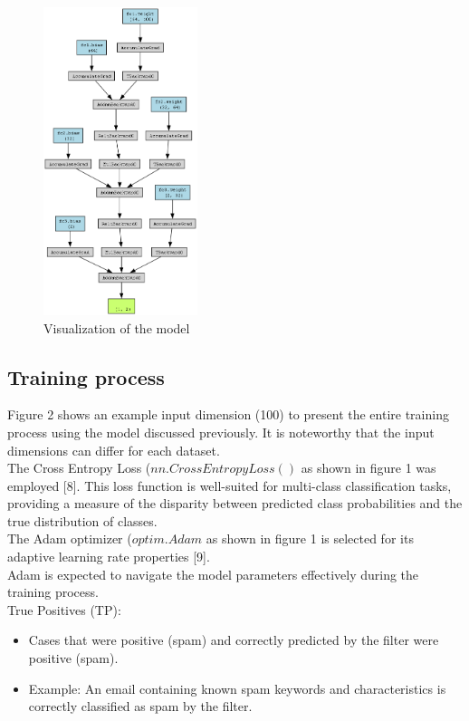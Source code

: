 \begin{figure}[htp]
    \centering
    \includegraphics[width=0.4\textwidth]{text_classifier_model.png}
    \caption{Visualization of the model}
\end{figure}

\subsection{Training process}
Figure 2 shows an example input dimension (100) to present the entire training process using the model discussed previously. It is noteworthy that the input dimensions can differ for each dataset. \\

\indent The Cross Entropy Loss ($nn.CrossEntropyLoss()$ as shown in figure 1 was employed [8].
This loss function is well-suited for multi-class classification tasks, providing a measure of the disparity between predicted class probabilities and the true distribution of classes. \\

\indent The Adam optimizer ($optim.Adam$ as shown in figure 1 is selected for its adaptive learning rate properties [9]. \\
Adam is expected to navigate the model parameters effectively during the training process. \\

True Positives (TP):
\begin{itemize}
  \item Cases that were positive (spam) and correctly predicted by the filter were positive (spam).
  \item Example: An email containing known spam keywords and characteristics is correctly classified as spam by the filter.
\end{itemize}

